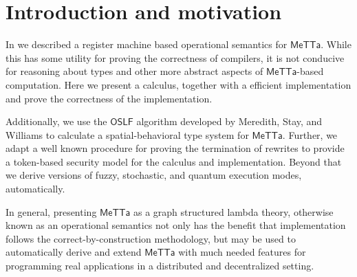\section{Introduction and motivation}

In \cite{arxiv:meta-metta-opsem:meredith} we described a register
machine based operational semantics for $\mathsf{MeTTa}$. While this
has some utility for proving the correctness of compilers, it is not
conducive for reasoning about types and other more abstract aspects of
$\mathsf{MeTTa}$-based computation. Here we present a calculus,
together with a efficient implementation and prove the correctness of
the implementation.

Additionally, we use the $\mathsf{OSLF}$ algorithm developed by
Meredith, Stay, and Williams to calculate a spatial-behavioral type
system for $\mathsf{MeTTa}$. Further, we adapt a well known procedure
for proving the termination of rewrites to provide a token-based
security model for the calculus and implementation. Beyond that we
derive versions of fuzzy, stochastic, and quantum execution modes,
automatically.

In general, presenting $\mathsf{MeTTa}$ as a graph structured lambda
theory, otherwise known as an operational semantics not only has the
benefit that implementation follows the correct-by-construction
methodology, but may be used to automatically derive and extend
$\mathsf{MeTTa}$ with much needed features for programming real
applications in a distributed and decentralized setting.
